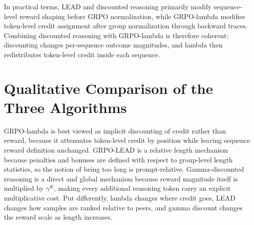 \documentclass[11pt]{article}
\begin{document}
In practical terms, LEAD and discounted reasoning primarily modify sequence-level reward shaping before GRPO normalization, while GRPO-lambda modifies token-level credit assignment after group normalization through backward traces. Combining discounted reasoning with GRPO-lambda is therefore coherent: discounting changes per-sequence outcome magnitudes, and lambda then redistributes token-level credit inside each sequence.

\section{Qualitative Comparison of the Three Algorithms}

GRPO-lambda is best viewed as implicit discounting of credit rather than reward, because it attenuates token-level credit by position while leaving sequence reward definition unchanged. GRPO-LEAD is a relative length mechanism because penalties and bonuses are defined with respect to group-level length statistics, so the notion of being too long is prompt-relative. Gamma-discounted reasoning is a direct and global mechanism because reward magnitude itself is multiplied by $\gamma^{K}$, making every additional reasoning token carry an explicit multiplicative cost. Put differently, lambda changes where credit goes, LEAD changes how samples are ranked relative to peers, and gamma discount changes the reward scale as length increases.



\end{document}

